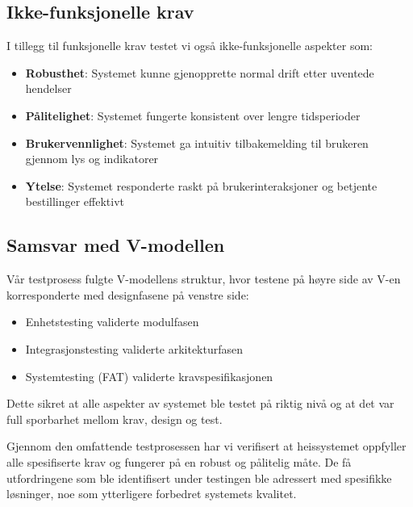 \subsection{Ikke-funksjonelle krav}
I tillegg til funksjonelle krav testet vi også ikke-funksjonelle aspekter som:

\begin{itemize}
    \item \textbf{Robusthet}: Systemet kunne gjenopprette normal drift etter uventede hendelser
    \item \textbf{Pålitelighet}: Systemet fungerte konsistent over lengre tidsperioder
    \item \textbf{Brukervennlighet}: Systemet ga intuitiv tilbakemelding til brukeren gjennom lys og indikatorer
    \item \textbf{Ytelse}: Systemet responderte raskt på brukerinteraksjoner og betjente bestillinger effektivt
\end{itemize}

\subsection{Samsvar med V-modellen}
Vår testprosess fulgte V-modellens struktur, hvor testene på høyre side av V-en korresponderte med designfasene på venstre side:

\begin{itemize}
    \item Enhetstesting validerte modulfasen
    \item Integrasjonstesting validerte arkitekturfasen
    \item Systemtesting (FAT) validerte kravspesifikasjonen
\end{itemize}

Dette sikret at alle aspekter av systemet ble testet på riktig nivå og at det var full sporbarhet mellom krav, design og test.

Gjennom den omfattende testprosessen har vi verifisert at heissystemet oppfyller alle spesifiserte krav og fungerer på en robust og pålitelig måte. De få utfordringene som ble identifisert under testingen ble adressert med spesifikke løsninger, noe som ytterligere forbedret systemets kvalitet.
